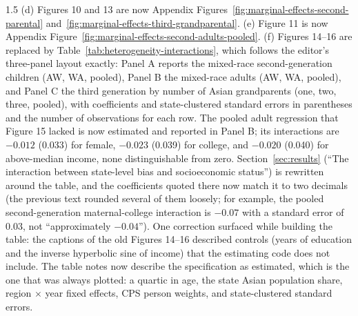 \documentclass[12pt,english]{article}
\newcommand{\rrxspc}{1.5}
\begin{document}
\begin{refsection}
\begin{spacing}{\rrxspc}
        (d) Figures 10 and 13 are now Appendix Figures~\ref{fig:marginal-effects-second-parental} and~\ref{fig:marginal-effects-third-grandparental}.
        (e) Figure 11 is now Appendix Figure~\ref{fig:marginal-effects-second-adults-pooled}.
        (f) Figures 14--16 are replaced by Table~\ref{tab:heterogeneity-interactions}, which follows the editor's three-panel layout exactly: Panel A reports the mixed-race second-generation children (AW, WA, pooled), Panel B the mixed-race adults (AW, WA, pooled), and Panel C the third generation by number of Asian grandparents (one, two, three, pooled), with coefficients and state-clustered standard errors in parentheses and the number of observations for each row. The pooled adult regression that Figure 15 lacked is now estimated and reported in Panel B; its interactions are $-0.012$ (0.033) for female, $-0.023$ (0.039) for college, and $-0.020$ (0.040) for above-median income, none distinguishable from zero. Section~\ref{sec:results} (``The interaction between state-level bias and socioeconomic status'') is rewritten around the table, and the coefficients quoted there now match it to two decimals (the previous text rounded several of them loosely; for example, the pooled second-generation maternal-college interaction is $-0.07$ with a standard error of 0.03, not ``approximately $-0.04$''). One correction surfaced while building the table: the captions of the old Figures 14--16 described controls (years of education and the inverse hyperbolic sine of income) that the estimating code does not include. The table notes now describe the specification as estimated, which is the one that was always plotted: a quartic in age, the state Asian population share, region $\times$ year fixed effects, CPS person weights, and state-clustered standard errors.
    \end{spacing}


\end{refsection}
\end{document}
